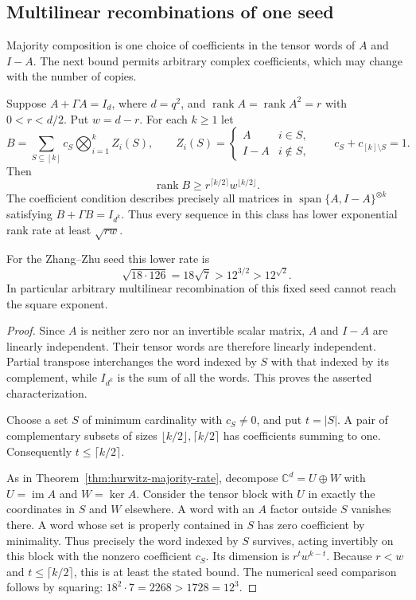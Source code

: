 \subsection{Multilinear recombinations of one seed}

Majority composition is one choice of coefficients in the tensor
words of $A$ and $I-A$. The next bound permits arbitrary complex
coefficients, which may change with the number of copies.

\begin{proposition}
\label{prop:hurwitz-multilinear-barrier}
Suppose $A+\Gamma A=I_d$, where $d=q^2$, and
$\operatorname{rank}A=\operatorname{rank}A^2=r$ with $0<r<d/2$.
Put $w=d-r$. For each $k\ge1$ let
\[
 B=\sum_{S\subseteq[k]}c_S
       \bigotimes_{i=1}^k Z_i(S),\qquad
 Z_i(S)=\begin{cases}A&i\in S,\\I-A&i\notin S,\end{cases}
 \qquad c_S+c_{[k]\setminus S}=1.
\]
Then
\[
 \operatorname{rank}B\ge r^{\lceil k/2\rceil}w^{\lfloor k/2\rfloor}.
\]
The coefficient condition describes precisely all matrices in
$\operatorname{span}\{A,I-A\}^{\otimes k}$ satisfying
$B+\Gamma B=I_{d^k}$. Thus every sequence in this class has lower
exponential rank rate at least $\sqrt{rw}$.

For the Zhang--Zhu seed this lower rate is
\[
 \sqrt{18\cdot126}=18\sqrt7>12^{3/2}>12^{\sqrt2}.
\]
In particular arbitrary multilinear recombination of this fixed seed
cannot reach the square exponent.
\end{proposition}

\begin{proof}
Since $A$ is neither zero nor an invertible scalar matrix, $A$ and
$I-A$ are linearly independent. Their tensor words are therefore
linearly independent. Partial transpose interchanges the word indexed
by $S$ with that indexed by its complement, while $I_{d^k}$ is the sum
of all the words. This proves the asserted characterization.

Choose a set $S$ of minimum cardinality with $c_S\ne0$, and put
$t=|S|$. A pair of complementary subsets of sizes
$\lfloor k/2\rfloor,\lceil k/2\rceil$ has coefficients summing to
one. Consequently $t\le\lceil k/2\rceil$.

As in Theorem~\ref{thm:hurwitz-majority-rate}, decompose
$\mathbb C^d=U\oplus W$ with $U=\operatorname{im}A$ and
$W=\ker A$. Consider the tensor block with $U$ in exactly the
coordinates in $S$ and $W$ elsewhere. A word with an $A$ factor
outside $S$ vanishes there. A word whose set is properly contained
in $S$ has zero coefficient by minimality. Thus precisely the word
indexed by $S$ survives, acting invertibly on this block with the
nonzero coefficient $c_S$. Its dimension is $r^t w^{k-t}$.
Because $r<w$ and $t\le\lceil k/2\rceil$, this is at least the
stated bound. The numerical seed comparison follows by squaring:
$18^2\cdot7=2268>1728=12^3$.
\end{proof}

